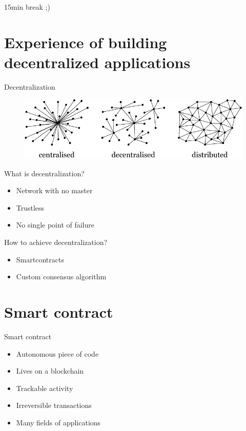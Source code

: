 \documentclass[12pt]{beamer}
\begin{document}
  \begin{frame}[standout]
    15min break ;)
  \end{frame}

  \section{Experience of building decentralized applications}

  \begin{frame}{Decentralization}
    \begin{figure}
      \includegraphics[height=.5\textheight]{images/centralised-decentralised-distributed}
    \end{figure}
  \end{frame}

  \begin{frame}{What is decentralization?}
    \begin{itemize}
      \item Network with \alert{no master}
      \item \alert{Trustless}
      \item No single point of failure
    \end{itemize}
  \end{frame}


  \begin{frame}{How to achieve decentralization?}
    \begin{itemize}
      \item \alert{Smartcontracts}
      \item Custom \alert{consensus} algorithm
    \end{itemize}
  \end{frame}




  \section{Smart contract}

  \begin{frame}{Smart contract}
    \begin{itemize}
      \item \alert{Autonomous} piece of code
      \item Lives on a \alert{blockchain}
      \item \alert{Trackable} activity
      \item \alert{Irreversible} transactions
      \item Many fields of applications
    \end{itemize}
  \end{frame}
\end{document}
